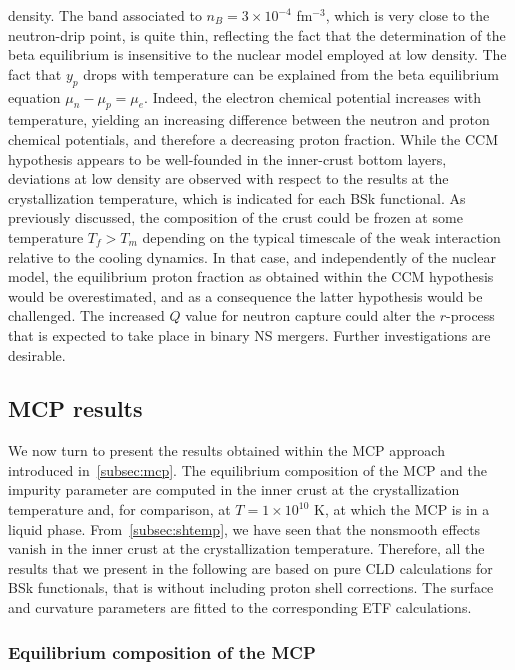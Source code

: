density. 
The band associated to $n_B = 3\times 10^{-4}$ fm$^{-3}$, which is
very close to the neutron-drip point, is quite thin, reflecting the fact 
that the determination of the beta equilibrium is insensitive to the nuclear 
model employed at low density.
%
The fact that $y_p$ drops with temperature can be explained from the beta 
equilibrium equation $\mu_n - \mu_p = \mu_e$. Indeed, 
the electron chemical potential increases with temperature, yielding an 
increasing difference between the neutron and proton chemical potentials, and 
therefore a decreasing proton fraction.
%
While the CCM hypothesis appears to be well-founded in the inner-crust bottom 
layers, deviations at low density are observed with respect to the results at 
the crystallization temperature, which is indicated for each BSk functional.
%
As previously discussed, the composition of the crust could be frozen at some
temperature $T_f > T_m$ depending on the typical timescale of the weak
interaction relative to the cooling dynamics. In that case, and independently
of the nuclear model, the equilibrium proton fraction as obtained within the 
CCM hypothesis would be overestimated, and as a consequence the latter 
hypothesis would be challenged.
%
The increased $Q$ value for neutron capture could alter the $r$-process that 
is expected to take place in binary NS mergers. Further investigations are 
desirable.

\subsection{MCP results}\label{subsec:mcp_results}

We now turn to present the results obtained within the MCP approach introduced
in~\ref{subsec:mcp}. 
%
The equilibrium composition of the MCP and the impurity parameter are
computed in the inner crust at the crystallization temperature and, for
comparison, at $T=1\times 10^{10}$ K, at which the MCP is in a liquid phase.
%
From~\ref{subsec:shtemp}, we have seen that the nonsmooth 
effects vanish in the inner crust at the crystallization temperature.
Therefore, all the results that we present in the following are based on pure
CLD calculations for BSk functionals, that is without including proton shell 
corrections. The surface and curvature parameters are fitted to the 
corresponding ETF calculations. 

\subsubsection{Equilibrium composition of the 
MCP}\label{subsubsec:mcp_compo_icrust}

